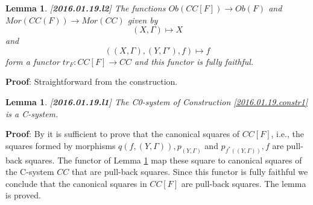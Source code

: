 \documentclass[11pt]{article}
\newenvironment{proof}{{\bf Proof}:}{\vskip 5mm }
\newtheorem{lemma}[proposition]{Lemma}
\newcommand{\llabel}[1]{\label{#1}[{\bf #1}]}
\newcommand{\sr}{\rightarrow}
\begin{document}
%
\begin{lemma}
\llabel{2016.01.19.l2}
The functions $Ob(CC[F])\sr Ob(F)$ and $Mor(CC(F))\sr Mor(CC)$ given by 
%
$$(X,\Gamma)\mapsto X$$
%
and
%
$$((X,\Gamma),(Y,\Gamma'),f)\mapsto f$$
%
form a functor $tr_F:CC[F]\sr CC$ and this functor is fully faithful.
\end{lemma}
%
\begin{proof}
Straightforward from the construction.
\end{proof}
%
\begin{lemma}\llabel{2016.01.19.l1}
The C0-system of Construction \ref{2016.01.19.constr1} is a C-system.
\end{lemma}
%
\begin{proof}
By \cite[Proposition 2.4]{Csubsystems} it is sufficient to prove that the canonical squares of $CC[F]$, i.e., the squares formed by morphisms $q(f,(Y,\Gamma)),p_{(Y,\Gamma)}$ and $p_{f^*((Y,\Gamma))}, f$ are pull-back squares. The functor of Lemma \ref{2016.01.19.l2} map these square to canonical squares of the C-system $CC$ that are pull-back squares. Since this functor is fully faithful we conclude that the canonical squares in $CC[F]$ are pull-back squares. The lemma is proved.
\end{proof}
\end{document}
